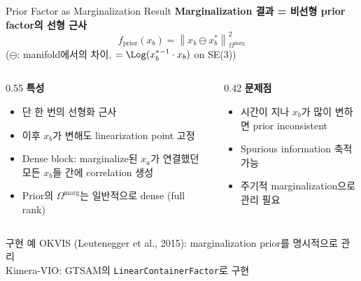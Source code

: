 \begin{frame}{Prior Factor as Marginalization Result}
  \textbf{Marginalization 결과 = 비선형 prior factor의 선형 근사}
  \[
    f_{\mathrm{prior}}(x_b) = \left\|x_b \ominus x_b^*\right\|_{\Omega^{\mathrm{marg}}}^2
  \]
  ($\ominus$: manifold에서의 차이, $= \Log(x_b^{*-1} \cdot x_b)$ on SE(3))
  \pause
  \begin{columns}[T]
    \begin{column}{0.55\textwidth}
      \textbf{특성}
      \begin{itemize}
        \item 단 한 번의 선형화 근사
        \item 이후 $x_b$가 변해도 linearization point 고정
        \item Dense block: marginalize된 $x_a$가 연결했던 모든 $x_b$들 간에 correlation 생성
        \item Prior의 $\Omega^{\mathrm{marg}}$는 일반적으로 dense (full rank)
      \end{itemize}
    \end{column}
    \begin{column}{0.42\textwidth}
      \textbf{문제점}
      \begin{itemize}
        \item 시간이 지나 $x_b$가 많이 변하면 prior inconsistent
        \item Spurious information 축적 가능
        \item 주기적 marginalization으로 관리 필요
      \end{itemize}
    \end{column}
  \end{columns}
  \pause
  \begin{exampleblock}{구현 예}
    OKVIS (Leutenegger et al., 2015): marginalization prior를 명시적으로 관리\\
    Kimera-VIO: GTSAM의 \texttt{LinearContainerFactor}로 구현
  \end{exampleblock}
\end{frame}

